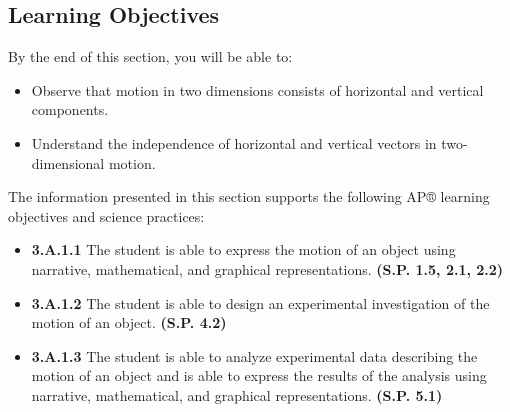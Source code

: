 \documentclass[
]{book}
\providecommand{\tightlist}{%
  \setlength{\itemsep}{0pt}\setlength{\parskip}{0pt}}
\newenvironment{learning-objectives}{}{}
\begin{document}
\hypertarget{fs-id1263980}{}
\begin{learning-objectives}

\hypertarget{learning-objectives-7}{%
\subsection{Learning Objectives}\label{learning-objectives-7}}

By the end of this section, you will be able to:

\begin{itemize}
\tightlist
\item
  Observe that motion in two dimensions consists of horizontal and
  vertical components.
\item
  Understand the independence of horizontal and vertical vectors in
  two-dimensional motion.
\end{itemize}

The information presented in this section supports the following AP®
learning objectives and science practices:

\begin{itemize}
\tightlist
\item
  \textbf{3.A.1.1} The student is able to express the motion of an object
  using narrative, mathematical, and graphical representations.
  \textbf{(S.P. 1.5, 2.1, 2.2)}
\item
  \textbf{3.A.1.2} The student is able to design an experimental
  investigation of the motion of an object. \textbf{(S.P. 4.2)}
\item
  \textbf{3.A.1.3} The student is able to analyze experimental data
  describing the motion of an object and is able to express the
  results of the analysis using narrative, mathematical, and graphical
  representations. \textbf{(S.P. 5.1)}
\end{itemize}

\end{learning-objectives}
\end{document}
